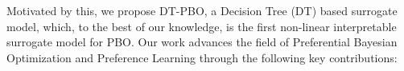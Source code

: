 \documentclass{article}
\begin{document}
Motivated by this, we propose DT-PBO, a Decision Tree (DT) based surrogate model, which, to the best of our knowledge, is the first non-linear interpretable surrogate model for PBO. Our work advances the field of Preferential Bayesian Optimization and Preference Learning through the following key contributions:
\end{document}
